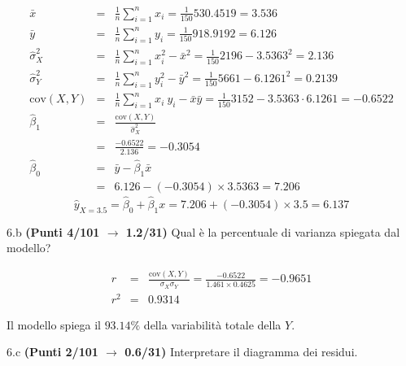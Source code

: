 \documentclass[
  11pt,
]{book}
\theoremstyle{mytheoremstyle}
\theoremstyle{mydefstyle}
\newenvironment{sol}
  {
  \begin{tcolorbox}[enhanced,breakable,arc=0.1mm,boxrule=1pt,colback=white,colframe=iblue,
  title=\bf \fontfamily{lmss}\selectfont \hspace{.5 cm} Soluzione,drop fuzzy shadow]

}{
\end{tcolorbox}
  }
\begin{document}
\begin{sol}
\begin{eqnarray*}
           \bar x &=&\frac 1 n\sum_{i=1}^n x_i = \frac {1}{ 150 }  530.4519 =  3.536 \\
           \bar y &=&\frac 1 n\sum_{i=1}^n y_i = \frac {1}{ 150 }  918.9192 =  6.126 \\
           \hat\sigma_X^2&=&\frac 1 n\sum_{i=1}^n x_i^2-\bar x^2=\frac {1}{ 150 }  2196  - 3.5363 ^2= 2.136 \\
           \hat\sigma_Y^2&=&\frac 1 n\sum_{i=1}^n y_i^2-\bar y^2=\frac {1}{ 150 }  5661  - 6.1261 ^2= 0.2139 \\
           \text{cov}(X,Y)&=&\frac 1 n\sum_{i=1}^n x_i~y_i-\bar x\bar y=\frac {1}{ 150 }  3152 - 3.5363 \cdot 6.1261 = -0.6522 \\
           \hat\beta_1 &=& \frac{\text{cov}(X,Y)}{\hat\sigma_X^2} \\
                    &=& \frac{ -0.6522 }{ 2.136 }  =  -0.3054 \\
           \hat\beta_0 &=& \bar y - \hat\beta_1 \bar x\\
                    &=&  6.126 - (-0.3054) \times  3.5363 = 7.206 
         \end{eqnarray*}\[\hat y_{X= 3.5 }=\hat\beta_0+\hat\beta_1 x= 7.206 + (-0.3054) \times 3.5 = 6.137 \]

\end{sol}

6.b \textbf{(Punti 4/101 \(\rightarrow\) 1.2/31)} Qual è la percentuale di varianza spiegata dal modello?

\begin{sol}
\begin{eqnarray*}
r&=&\frac{\text{cov}(X,Y)}{\sigma_X\sigma_Y}=\frac{ -0.6522 }{ 1.461 \times 0.4625 }= -0.9651 \\ 
r^2&=& 0.9314\end{eqnarray*}

Il modello spiega il \(93.14\%\) della variabilità totale della \(Y\).

\end{sol}

6.c \textbf{(Punti 2/101 \(\rightarrow\) 0.6/31)} Interpretare il diagramma dei residui.
\end{document}
